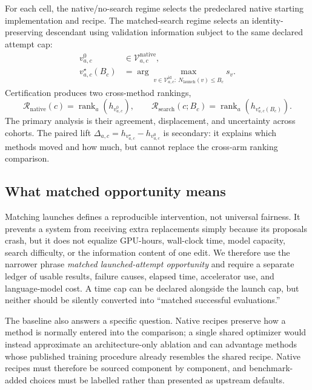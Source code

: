 \documentclass{article}
\newcommand{\Rnative}{\mathcal{R}_{\mathrm{native}}}
\newcommand{\Rsearch}{\mathcal{R}_{\mathrm{search}}}
\begin{document}
For each cell, the native/no-search regime selects the predeclared native
starting implementation and recipe.  The matched-search regime selects an
identity-preserving descendant using validation information subject to the same
declared attempt cap:
\begin{align}
  v^{0}_{a,c} &\in \mathcal{V}^{\mathrm{native}}_{a,c},\\
  v^{\star}_{a,c}(B_c)
      &= \arg\max_{v\in\mathcal{V}^{\mathrm{id}}_{a,c}:~
                   N_{\mathrm{launch}}(v)\leq B_c} s_v .
\end{align}
Certification produces two cross-method rankings,
\begin{equation}
  \Rnative(c)=\operatorname{rank}_{a}\!\left(h_{v^{0}_{a,c}}\right),\qquad
  \Rsearch(c;B_c)=\operatorname{rank}_{a}\!\left(h_{v^{\star}_{a,c}(B_c)}\right).
\end{equation}
The primary analysis is their agreement, displacement, and uncertainty across
cohorts.  The paired lift
$\Delta_{a,c}=h_{v^{\star}_{a,c}}-h_{v^{0}_{a,c}}$ is secondary: it explains
which methods moved and how much, but cannot replace the cross-arm ranking
comparison.

\subsection{What matched opportunity means}

Matching launches defines a reproducible intervention, not universal fairness.
It prevents a system from receiving extra replacements simply because its
proposals crash, but it does not equalize GPU-hours, wall-clock time, model
capacity, search difficulty, or the information content of one edit.  We
therefore use the narrower phrase \emph{matched launched-attempt opportunity}
and require a separate ledger of usable results, failure causes, elapsed time,
accelerator use, and language-model cost.  A time cap can be declared alongside
the launch cap, but neither should be silently converted into ``matched
successful evaluations.''

The baseline also answers a specific question.  Native recipes preserve how a
method is normally entered into the comparison; a single shared optimizer
would instead approximate an architecture-only ablation and can advantage
methods whose published training procedure already resembles the shared
recipe.  Native recipes must therefore be sourced component by component, and
benchmark-added choices must be labelled rather than presented as upstream
defaults.
\end{document}
